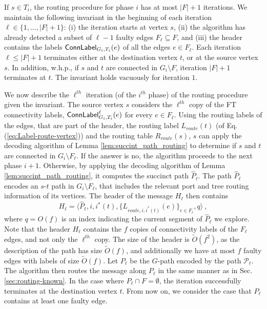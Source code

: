 If $s \in T_i$, the routing procedure for phase $i$ has at most $|F|+1$ iterations. We maintain the following invariant in the beginning of each iteration $\ell \in \{1,\ldots, |F|+1\}$: (i) the iteration starts at vertex $s$, (ii) the algorithm has already detected a subset of $\ell-1$ faulty edges $F_\ell \subseteq F$, and (iii) the header contains the labels $\mathsf{ConnLabel}_{G_i,T_i}(e)$ of all the edges $e \in F_\ell$. Each iteration $\ell \leq |F|+1$ terminates either at the destination vertex $t$, or at the source vertex $s$. In addition, w.h.p., if $s$ and $t$ are connected in $G_i \setminus F$, iteration $|F|+1$ terminates at $t$. The invariant holds vacuously for iteration $1$.

We now describe the $\ell^{th}$ iteration (of the $i^{th}$ phase) of the routing procedure given the invariant. The source vertex $s$ considers the $\ell^{th}$ copy of the FT connectivity labels, $\mathsf{ConnLabel}^{\ell}_{G_i,T_i}(e)$ for every $e\in F_\ell$. 
Using the routing labels of the edges, that are part of the header, the routing label $L_{route}(t)$ (of Eq. (\ref{eq:Label-route-vertex})) and the routing table $R_{route}(s)$, $s$ can apply the decoding algorithm of 
Lemma \ref{lem:succint_path_routing} to determine if $s$ and $t$ are connected in $G_i \setminus F_\ell$. 
If the answer is no, the algorithm proceeds to the next phase $i+1$.
Otherwise, by applying the decoding algorithm of Lemma \ref{lem:succint_path_routing}, it computes the succinct path $\widehat{P}_\ell$. The path $\widehat{P}_\ell$ encodes an $s$-$t$ path in $G_i \setminus F_\ell$, that includes the relevant port and tree routing information of its vertices. The header of the message $H_\ell$ then contains 
$$H_\ell=\langle \widehat{P}_\ell, i, i^*(t), \{L_{route, i, i^*(t)}(e)\}_{e \in F_{\ell}}, q \rangle~,$$ where $q = O(f)$ is an index indicating the current segment of $\widehat{P}_\ell$ we explore. Note that the header $H_\ell$ contains the $f$ copies of connectivity labels of the $F_{\ell}$ edges, and not only the $\ell^{th}$ copy.
The size of the header is $\widetilde{O}(f^2)$, as the description of the path has size $\widetilde{O}(f)$, and additionally we have at most $f$ faulty edges with labels of size $\widetilde{O}(f)$.
%
Let $P_\ell$ be the $G$-path encoded by the path $\mathcal{P}_\ell$. The algorithm then routes the message along $P_\ell$ in the same manner as in Sec. \ref{sec:routing-known}. In the case where $P_{\ell}\cap F=\emptyset$, the iteration successfully terminates at the destination vertex $t$. From now on, we consider the case that $P_{\ell}$ contains at least one faulty edge. 

